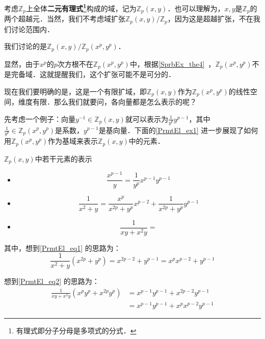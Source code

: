 考虑$\mathbb{Z}_p$上全体\textbf{二元有理式\footnote{有理式即分子分母是多项式的分式．}}构成的域，记为$\mathbb{Z}_p(x, y)$．也可以理解为，$x, y$是$\mathbb{Z}_p$的两个超越元．当然，我们不考虑域扩张$\mathbb{Z}_p(x, y)/\mathbb{Z}_p$，因为这是超越扩张，不在我们讨论范围内．

我们讨论的是$\mathbb{Z}_p(x, y)/\mathbb{Z}_p(x^p, y^p)$．

显然，由于$x^p$的$p$次方根不在$\mathbb{Z}_p(x^p, y^p)$中，根据\autoref{SprbEx_the4}~，$\mathbb{Z}_p(x^p, y^p)$不是完备域．这就提醒我们，这个扩张可能不是可分的．

现在我们要明确的是，这是一个有限扩域，即$\mathbb{Z}_p(x, y)$作为$\mathbb{Z}_p(x^p, y^p)$的线性空间，维度有限．那么我们就要问，各向量都是怎么表示的呢？

先考虑一个例子：向量$y^{-1}\in\mathbb{Z}_p(x, y)$就可以表示为$\frac{1}{y^p}y^{p-1}$，其中$\frac{1}{y^p}\in\mathbb{Z}_p(x^p, y^p)$是系数，$y^{p-1}$是基向量．下面的\autoref{PrmtEl_ex1} 进一步展现了如何用$\mathbb{Z}_p(x^p, y^p)$作为基域来表示$\mathbb{Z}_p(x, y)$中的元素．

\begin{example}{$\mathbb{Z}_p(x, y)$中若干元素的表示}\label{PrmtEl_ex1}


\begin{itemize}

\item 
\begin{equation}
\frac{x^{p-1}}{y} = \frac{1}{y^p}x^{p-1}y^{p-1}
\end{equation}

\item 
\begin{equation}\label{PrmtEl_eq1}
\frac{1}{x^2+y} = \frac{x^p}{x^{2p}+y^p}x^{p-2} + \frac{1}{x^{2p}+y^p}y^{p-1}
\end{equation}

\item 
\begin{equation}\label{PrmtEl_eq2}
\frac{1}{xy+x^2y} = 
\end{equation}

\end{itemize}



其中，想到\autoref{PrmtEl_eq1} 的思路为：
\begin{equation}
\frac{1}{x^2+y}(x^{2p}+y^p) = x^{2p-2}+y^{p-1} = x^px^{p-2}+y^{p-1}
\end{equation}

想到\autoref{PrmtEl_eq2} 的思路为：
\begin{equation}
\begin{aligned}
\frac{1}{xy+x^2y}(x^py^p+x^{2p}y^p) &= x^{p-1}y^{p-1}+x^{2p-2}y^{p-1} \\
&= x^{p-1}y^{p-1}+x^px^{p-2}y^{p-1}
\end{aligned}
\end{equation}

\end{example}

